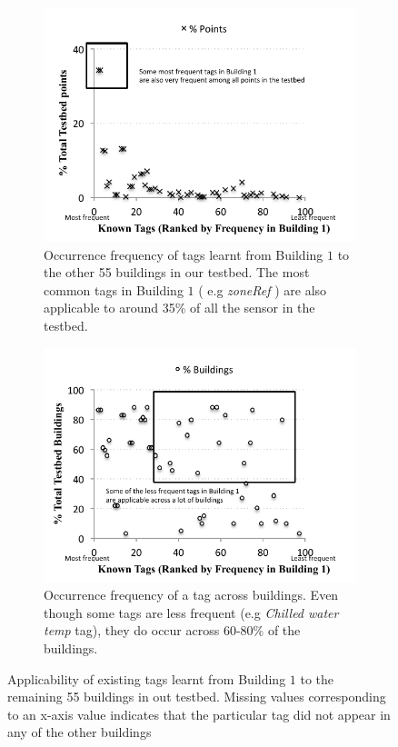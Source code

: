 \begin{figure}[h!]
\centering
	\begin{subfigure}{0.40\textwidth}
                \centering
		\includegraphics[width=\textwidth]{./figs/campusWideStats-point.pdf}
                \caption{Occurrence frequency of tags learnt from Building $1$ to the other 55 buildings in our testbed. The most common tags in Building $1$ ( e.g {\it zoneRef} ) are also applicable to around 35\% of all the sensor in the testbed.}
                \label{fig:campusWideStats-build}
	\end{subfigure}
	\begin{subfigure}{0.40\textwidth}
                \centering
		\includegraphics[width=\textwidth]{./figs/campusWideStats-build.pdf}
                \caption{Occurrence frequency of a tag across buildings. Even though some tags are less frequent (e.g {\it Chilled water temp} tag), they do occur across 60-80\% of the buildings. }
                \label{fig:campusWideStats-build}
	\end{subfigure}
\caption{Applicability of existing tags learnt from Building $1$ to the remaining 55 buildings in out testbed. Missing values corresponding to an x-axis value indicates that the particular tag did not appear in any of the other buildings}
\label{fig:campusWideStats}
\end{figure}


